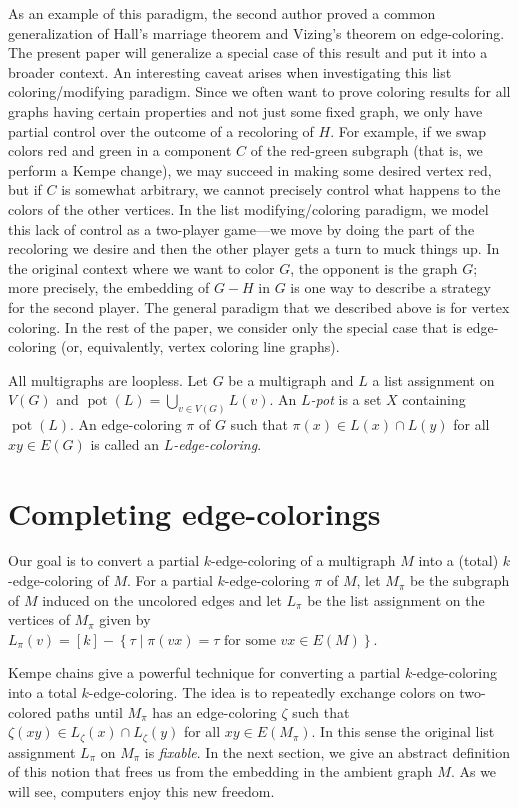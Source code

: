 \documentclass[12pt]{article}
\theoremstyle{plain}
\theoremstyle{definition}
\theoremstyle{remark}
\newcommand{\setbs}[2]{\left\{ #1 \mid #2 \right\}}
\newcommand{\irange}[1]{\left[#1\right]}
\newcommand{\pot}{\operatorname{pot}}
\begin{document}
As an example of this paradigm,
the second author proved \cite{HallGame} 
a common generalization of Hall's marriage theorem and Vizing's theorem on
edge-coloring.  The present paper will generalize a
special case of this result and put it into a broader context.  An interesting
caveat arises when investigating this list coloring/modifying paradigm. 
Since we often want to prove coloring results for all graphs having
certain properties and not just some fixed graph, we only have partial control
over the outcome of a recoloring of $H$. For example, if we swap colors red and
green in a component $C$ of the red-green subgraph (that is, we perform a Kempe
change), we may succeed in making some desired vertex red,
but if $C$ is somewhat arbitrary, we cannot precisely control what happens
to the colors of the other vertices.  In the list modifying/coloring paradigm,
we model this lack of control as a two-player game---we move by doing the part
of the recoloring we desire and then the other player gets a turn to muck things up. 
In the original context where we want to color $G$, the opponent is the graph
$G$; more precisely, the embedding of $G-H$ in $G$ is one way to describe a
strategy for the second player. The general paradigm that we described above is for vertex coloring.  In the
rest of the paper, we consider only the special case that is edge-coloring (or,
equivalently, vertex coloring line graphs).  

All multigraphs are loopless.  Let $G$ be a multigraph and $L$ a list assignment on $V(G)$ and $\pot(L) = \bigcup_{v\in V(G)} L(v)$. An \emph{$L$-pot} is a set $X$ containing $\pot(L)$. 
An edge-coloring $\pi$ of $G$ such that $\pi(x) \in L(x) \cap L(y)$ for all $xy \in E(G)$ is called an \emph{$L$-edge-coloring}.

\section{Completing edge-colorings}
Our goal is to convert a partial $k$-edge-coloring of a multigraph $M$ into a (total) $k$-edge-coloring of $M$.  For a partial $k$-edge-coloring $\pi$ of $M$, let $M_\pi$ be the subgraph of $M$ induced on the uncolored edges and let $L_\pi$ be the list assignment on the vertices of $M_\pi$ given by 
$L_\pi(v) = \irange{k} - \setbs{\tau}{\pi(vx) = \tau \text{ for some  } vx \in E(M)}$. 

Kempe chains give a powerful technique for converting a partial $k$-edge-coloring into a total $k$-edge-coloring.  The idea is to repeatedly exchange colors on two-colored paths until $M_\pi$ has an edge-coloring $\zeta$ such that $\zeta(xy) \in L_\zeta(x) \cap L_\zeta(y)$ for all $xy \in E(M_\pi)$.  In this sense the original list assignment $L_\pi$ on $M_\pi$ is \emph{fixable}. In the next section, we give an abstract definition of this notion that frees us from the embedding in the ambient graph $M$.  As we will see, computers enjoy this new freedom.
\end{document}
